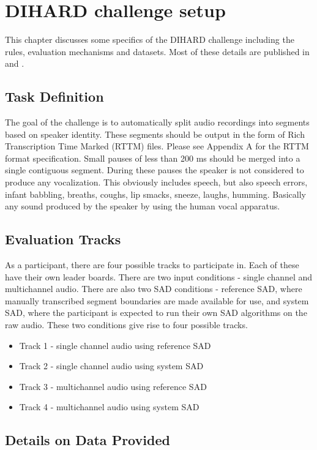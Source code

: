 \chapter{DIHARD challenge setup}

This chapter discusses some specifics of the DIHARD challenge including the rules, evaluation mechanisms and datasets. Most of these details are published in \cite{ryant2019second} and \cite{ryant2019second2}.

\section{Task Definition}
The goal of the challenge is to automatically split audio recordings into segments based on speaker identity. These segments should be output in the form of Rich Transcription Time Marked (RTTM) files. Please see Appendix A for the RTTM format specification. Small pauses of less than 200 ms should be merged into a single contiguous segment. During these pauses the speaker is not considered to produce any vocalization. This obviously includes speech, but also speech errors, infant babbling, breaths, coughs, lip smacks, sneeze, laughs, humming. Basically any sound produced by the speaker by using the human vocal apparatus.

\section{Evaluation Tracks}
As a participant, there are four possible tracks to participate in. Each of these have their own leader boards. There are two input conditions - single channel and multichannel audio. There are also two SAD conditions - reference SAD, where manually transcribed segment boundaries are made available for use, and system SAD, where the participant is expected to run their own SAD algorithms on the raw audio. These two conditions give rise to four possible tracks.

\begin{itemize}
	\item Track 1 - single channel audio using reference SAD
	\item Track 2 - single channel audio using system SAD
	\item Track 3 - multichannel audio using reference SAD
	\item Track 4 - multichannel audio using system SAD
\end{itemize}

\section{Details on Data Provided}

